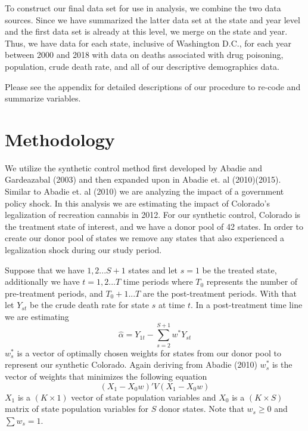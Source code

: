 \documentclass{article}
\begin{document}
To construct our final data set for use in analysis, we combine the two data sources. Since we have summarized the latter data set at the state and year level and the first data set is already at this level, we merge on the state and year. Thus, we have data for each state, inclusive of Washington D.C., for each year between 2000 and 2018 with data on deaths associated with drug poisoning, population, crude death rate, and all of our descriptive demographics data.



Please see the appendix for detailed descriptions of our procedure to re-code and summarize variables.

\section{Methodology}

We utilize the synthetic control method first developed by Abadie and Gardeazabal (2003) and then expanded upon in Abadie et. al (2010)(2015). Similar to Abadie et. al (2010) we are analyzing the impact of a government policy shock. In this analysis we are estimating the impact of Colorado's legalization of recreation cannabis in 2012. For our synthetic control, Colorado is the treatment state of interest, and we have a donor pool of 42 states. In order to create our donor pool of states we remove any states that also experienced a legalization shock during our study period.

Suppose that we have $1,2...S+1$ states and let $s = 1$ be the treated state, additionally we have $t = 1,2...T$ time periods where $T_0$ represents the number of pre-treatment periods, and $T_0 + 1...T$ are the post-treatment periods. With that let $Y_{st}$ be the crude death rate for state $s$ at time $t$. In a post-treatment time line we are estimating
\begin{equation*}
\hat{\alpha} = Y_{1t} - \sum_{s=2}^{S+1}w^{*}Y_{st}
\end{equation*}
$w^{*}_s$ is a vector of optimally chosen weights for states from our donor pool to represent our synthetic Colorado. Again deriving from Abadie (2010) $w^{*}_s$ is the vector of weights that minimizes the following equation
\begin{equation*}
(X_1 - X_0w)'V(X_1 - X_0w)
\end{equation*}
$X_1$ is a $(K \times 1)$ vector of state population variables and $X_0$ is a $(K \times S)$ matrix of state population variables for $S$ donor states. Note that $w_s \geq 0$ and $\sum w_s = 1$.
\end{document}
